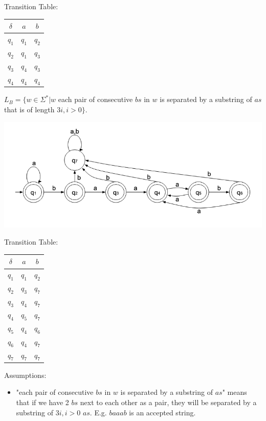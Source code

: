 \documentclass{article}
\begin{document}
Transition Table:
\begin{center}
\begin{tabular}{||c c c||} 
 \hline
 $\delta$ & $a$ & $b$\\ [0.5ex] 
 \hline\hline
 $q_1$ & $q_1$ & $q_2$\\
 \hline
 $q_2$ & $q_1$ & $q_3$\\
 \hline
 $q_3$ & $q_4$ & $q_3$\\
 \hline
 $q_4$& $q_4$ & $q_4$\\
 \hline
\end{tabular}
\end{center}

\smallskip
$L_B=\{w \in \Sigma^* | w$ each pair of consecutive $bs$ in $w$ is separated by a substring of $as$ that is of length $3i,i>0\}$.\\

\begin{center}
    \includegraphics[width=1\textwidth]{2-2.png}
\end{center}

Transition Table:
\begin{center}
\begin{tabular}{||c c c||} 
 \hline
 $\delta$ & $a$ & $b$\\ [0.5ex] 
 \hline\hline
 $q_1$ & $q_1$ & $q_2$\\
 \hline
 $q_2$ & $q_3$ & $q_7$\\
 \hline
 $q_3$ & $q_4$ & $q_7$\\
 \hline
 $q_4$& $q_5$ & $q_7$\\
 \hline
 $q_5$& $q_4$ & $q_6$\\
 \hline
 $q_6$& $q_4$ & $q_7$\\
 \hline
 $q_7$& $q_7$ & $q_7$\\
 \hline
\end{tabular}
\end{center}

Assumptions:
\begin{itemize}
  \item "each pair of consecutive $bs$ in $w$ is separated by a substring of $as$" means that if we have 2 $bs$ next to each other as a pair, they will be separated by a substring of $3i, i > 0$ $as$. E.g. $baaab$ is an accepted string.
\end{itemize}
\end{document}
